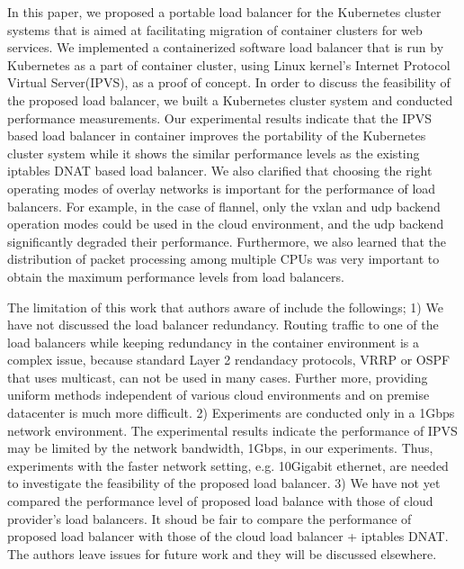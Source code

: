 In this paper, we proposed a portable load balancer for the Kubernetes cluster systems 
that is aimed at facilitating migration of container clusters for web services.
We implemented a containerized software load balancer that is run by Kubernetes as a part of container cluster, 
using Linux kernel's Internet Protocol Virtual Server(IPVS), as a proof of concept.
In order to discuss the feasibility of the proposed load balancer, we built 
a Kubernetes cluster system and conducted performance measurements.
Our experimental results indicate that the IPVS based load balancer in container improves the portability of 
the Kubernetes cluster system while it shows the similar performance levels as the existing iptables DNAT based load balancer.
We also clarified that choosing the right operating modes of overlay networks is important for the performance of load balancers. 
For example, in the case of flannel, only the vxlan and udp backend operation modes could be used 
in the cloud environment, and the udp backend significantly degraded their performance.
Furthermore, we also learned that the distribution of packet processing among multiple CPUs was very important
to obtain the maximum performance levels from load balancers.
%

The limitation of this work that authors aware of include the followings; 
1) We have not discussed the load balancer redundancy. 
Routing traffic to one of the load balancers while keeping redundancy in the container environment is a complex issue,
because standard Layer 2 rendandacy protocols, VRRP or OSPF that uses multicast, can not be used in many cases.
Further more, providing uniform methods independent of various cloud environments and on premise datacenter is much more difficult.   
2) Experiments are conducted only in a 1Gbps network environment.
The experimental results indicate the performance of IPVS may be limited by the network bandwidth, 1Gbps, in our experiments. 
Thus, experiments with the faster network setting, e.g. 10Gigabit ethernet, are needed to investigate the feasibility of the proposed load balancer.
3) We have not yet compared the performance level of proposed load balance with those of cloud provider's load balancers.
It shoud be fair to compare the performance of proposed load balancer with those of the cloud load balancer + iptables DNAT. 
The authors leave issues for future work and they will be discussed elsewhere.




